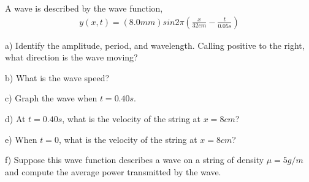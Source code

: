 \documentclass[10pt]{article}
\newenvironment{problem}[2][Problem]{\begin{trivlist}
\item[\hskip \labelsep {\bfseries #1}\hskip \labelsep {\bfseries #2.}]}{\end{trivlist}}
\begin{document}
\begin{problem}{5}
A wave is described by the wave function,
\begin{align}
y(x, t) = (8.0mm) sin 2 \pi \left( \frac{x}{32cm} - \frac{t}{0.05s}\right) \nonumber
\end{align}
\item
a) Identify the amplitude, period, and wavelength. Calling positive to the right, what direction is the wave moving?
\item
b) What is the wave speed?
\item
c) Graph the wave when $t=0.40s$.
\item
d) At $t=0.40s$, what is the velocity of the string at $x=8cm$?
\item
e) When $t=0$, what is the velocity of the string at $x=8cm$?
\item
f) Suppose this wave function describes a wave on a string of density $\mu=5g/m$ and compute the average power transmitted by the wave.
\end{problem}



\end{document}
